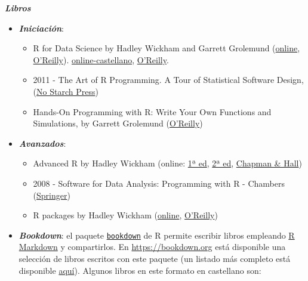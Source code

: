 \documentclass[
]{book}
\begin{document}
\textbf{\emph{Libros}}

\begin{itemize}
\item
  \textbf{\emph{Iniciación}}:

  \begin{itemize}
  \item
    R for Data Science by Hadley Wickham and Garrett Grolemund
    (\href{http://r4ds.had.co.nz/}{online}, \href{http://shop.oreilly.com/product/0636920034407.do}{O'Reilly}). \href{https://es.r4ds.hadley.nz}{online-castellano}, \href{http://shop.oreilly.com/product/0636920034407.do}{O'Reilly}.
  \item
    2011 - The Art of R Programming. A Tour of Statistical Software Design,
    (\href{https://www.nostarch.com/artofr.htm}{No Starch Press})
  \item
    Hands-On Programming with R: Write Your Own Functions and Simulations,
    by Garrett Grolemund
    (\href{http://shop.oreilly.com/product/0636920028574.do}{O'Reilly})
  \end{itemize}
\item
  \textbf{\emph{Avanzados}}:

  \begin{itemize}
  \item
    Advanced R by Hadley Wickham
    (online: \href{http://adv-r.had.co.nz/}{1ª ed},
    \href{https://adv-r.hadley.nz/}{2ª ed},
    \href{https://www.amazon.com/dp/1466586966}{Chapman \& Hall})
  \item
    2008 - Software for Data Analysis: Programming with R - Chambers
    (\href{http://www.springer.com/la/book/9780387759357}{Springer})
  \item
    R packages by Hadley Wickham
    (\href{http://r-pkgs.had.co.nz/}{online},
    \href{http://shop.oreilly.com/product/0636920034421.do}{O'Reilly})
  \end{itemize}
\item
  \textbf{\emph{Bookdown}}:
  el paquete \href{https://bookdown.org}{\texttt{bookdown}} de R permite escribir libros empleando
  \href{http://rmarkdown.rstudio.com}{R Markdown} y compartirlos.
  En \url{https://bookdown.org} está disponible una selección de libros escritos con este paquete
  (un listado más completo está disponible \href{https://bookdown.org/home/archive/}{aquí}).
  Algunos libros en este formato en castellano son:


\end{itemize}
\end{document}
